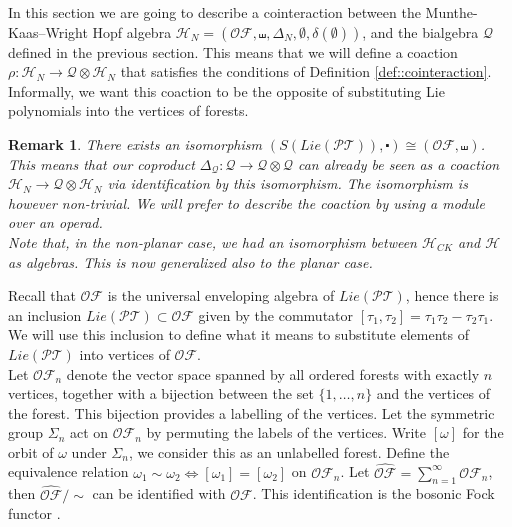 \documentclass[10pt,a4paper]{article}
\newtheorem{remark}{Remark}
\begin{document}
In this section we are going to describe a cointeraction between the Munthe-Kaas--Wright Hopf algebra $\mathcal{H}_N=(\mathcal{OF},\shuffle,\Delta_N,\emptyset,\delta(\emptyset))$, and the bialgebra $\mathcal{Q}$ defined in the previous section. This means that we will define a coaction $\rho: \mathcal{H}_N \to \mathcal{Q} \otimes \mathcal{H}_N$ that satisfies the conditions of Definition \ref{def::cointeraction}. Informally, we want this coaction to be the opposite of substituting Lie polynomials into the vertices of forests.

\begin{remark}
	There exists an isomorphism \cite{FloystadMunthe-Kaas} $(S(Lie(\mathcal{PT})),\centerdot) \cong (\mathcal{OF},\shuffle)$. This means that our coproduct $\Delta_{\mathcal{Q}} : \mathcal{Q} \to \mathcal{Q} \otimes \mathcal{Q}$ can already be seen as a coaction $\mathcal{H}_N \to \mathcal{Q} \otimes \mathcal{H}_N$ via identification by this isomorphism. The isomorphism is however non-trivial. We will prefer to describe the coaction by using a module over an operad.\\ 
	Note that, in the non-planar case, we had an isomorphism between $\mathcal{H}_{CK}$ and $\mathcal{H}$ as algebras. This is now generalized also to the planar case.
\end{remark}

Recall that $\mathcal{OF}$ is the universal enveloping algebra of $Lie(\mathcal{PT})$, hence there is an inclusion $Lie(\mathcal{PT}) \subset \mathcal{OF}$ given by the commutator $[\tau_1,\tau_2]=\tau_1\tau_2 - \tau_2\tau_1$. We will use this inclusion to define what it means to substitute elements of $Lie(\mathcal{PT})$ into vertices of $\mathcal{OF}$. \\

Let $\mathcal{OF}_n$ denote the vector space spanned by all ordered forests with exactly $n$ vertices, together with a bijection between the set $\{1,\ldots,n \}$ and the vertices of the forest. This bijection provides a labelling of the vertices. Let the symmetric group $\Sigma_n$ act on $\mathcal{OF}_n$ by permuting the labels of the vertices. Write $[\omega]$ for the orbit of $\omega$ under $\Sigma_n$, we consider this as an unlabelled forest. Define the equivalence relation $\omega_1 \sim \omega_2 \iff [\omega_1]=[\omega_2]$ on $\mathcal{OF}_n$. Let $\widehat{\mathcal{OF}}=\sum_{n=1}^{\infty}\mathcal{OF}_n$, then $\widehat{\mathcal{OF}}/\sim$ can be identified with $\mathcal{OF}$. This identification is the bosonic Fock functor \cite{aguiar2010monoidal}. \\
\end{document}
